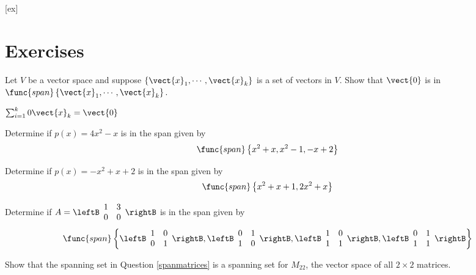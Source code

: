 [ex]
\section*{Exercises}

\begin{enumialphparenastyle}

\begin{ex} Let $V$ be a vector space and suppose $\left\{ \vect{x}_{1},\cdots ,
\vect{x}_{k}\right\}$ is a set of vectors in $V$. Show that $\vect{0}$
is in $\func{span}\left\{ \vect{x}_{1},\cdots ,\vect{x}_{k}\right\} .$
\begin{sol}
$\sum_{i=1}^{k}0\vect{x}_{k}=\vect{0}$
\end{sol}
\end{ex}

\begin{ex} Determine if $p(x) = 4x^2-x$ is in the span given by
\[ 
\func{span} \left\{ x^2+x, x^2-1, -x + 2 \right\}
\]
\end{ex}

\begin{ex} Determine if $p(x) = - x^2 + x + 2 $ is in the span given by 
\[
\func{span} \left\{ x^2 + x + 1, 2x^2 + x \right\}
\]
\end{ex}

\begin{ex} \label{spanmatrices} Determine if $A = \leftB \begin{array}{rr}
1 & 3 \\
0 & 0 
\end{array} \rightB$ is in the span given by 
\[
\func{span} \left\{ 
\leftB \begin{array}{rr}
1 & 0 \\
0 & 1 
\end{array} \rightB, \leftB \begin{array}{rr}
0 & 1 \\
1 & 0 
\end{array} \rightB, \leftB \begin{array}{rr}
1 & 0 \\
1 & 1 
\end{array} \rightB, \leftB \begin{array}{rr}
0 & 1 \\
1 & 1 
\end{array} \rightB
\right\}
\]
\end{ex}


\begin{ex} Show that the spanning set in Question \ref{spanmatrices} is a spanning set for $M_{22}$, the vector space of all $2 \times 2$ matrices. 
\end{ex}

\end{enumialphparenastyle}